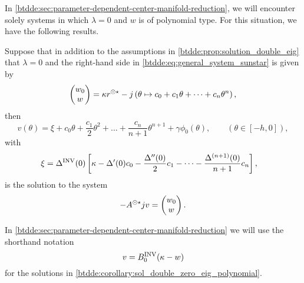 In \cref{btdde:sec:parameter-dependent-center-manifold-reduction}, we will encounter
solely systems in which $\lambda=0$ and $w$ is of polynomial type. For this
situation, we have the following results.

\begin{corollary}
\label{btdde:corollary:sol_double_zero_eig_polynomial} 
Suppose that in addition to the assumptions in \cref{btdde:prop:solution_double_eig} that $\lambda = 0$ and the right-hand side in \cref{btdde:eq:general_system_sunstar} is given by
\[
\begin{pmatrix}
w_0 \\ w
\end{pmatrix}
=
\kappa r^{\odot\star} - j\left(\theta \mapsto c_0 + c_1 \theta + \dots + c_n \theta^n\right),
\]
then
\[
    v(\theta) = \xi + c_0 \theta + \frac{c_1}2 \theta^2 + \dots + \frac{c_n}{n + 1} \theta^{n + 1} + \gamma \phi_0(\theta), 
                \qquad\left(\theta\in[-h,0]\right),
\]
with
\begin{align*}
    \xi & = \Delta^{\mathrm{INV}}(0)\left[\kappa - \Delta'(0) c_0  - \frac{\Delta''(0)}2 c_1 - \dots - \frac{\Delta^{(n + 1)}(0)}{n + 1} c_n \right],
\end{align*}
is the solution to the system
\[
-A^{\odot\star} j v  = 
\begin{pmatrix}
w_0 \\ w
\end{pmatrix}.
\]
\end{corollary}

\begin{remark}
In \cref{btdde:sec:parameter-dependent-center-manifold-reduction} we will use the shorthand notation
\[
    v = B^{\mathrm{INV}}_{0} (\kappa - w)
\]
for the solutions in \cref{btdde:corollary:sol_double_zero_eig_polynomial}.
\end{remark}

